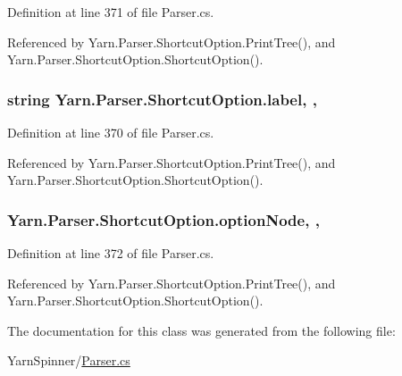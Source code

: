Definition at line 371 of file Parser.\-cs.



Referenced by Yarn.\-Parser.\-Shortcut\-Option.\-Print\-Tree(), and Yarn.\-Parser.\-Shortcut\-Option.\-Shortcut\-Option().

\hypertarget{a00161_ab43ec731479a56891389f6ece87f5f62}{
\subsubsection[{label}]{\setlength{\rightskip}{0pt plus 5cm}string Yarn.\-Parser.\-Shortcut\-Option.\-label\hspace{0.3cm}{\ttfamily [get]}, {\ttfamily [set]}, {\ttfamily [package]}}}\label{a00161_ab43ec731479a56891389f6ece87f5f62}


Definition at line 370 of file Parser.\-cs.



Referenced by Yarn.\-Parser.\-Shortcut\-Option.\-Print\-Tree(), and Yarn.\-Parser.\-Shortcut\-Option.\-Shortcut\-Option().

\hypertarget{a00161_a33d667370031f58b054b79a39891c3f3}{
\subsubsection[{option\-Node}]{ Yarn.\-Parser.\-Shortcut\-Option.\-option\-Node\hspace{0.3cm}{\ttfamily [get]}, {\ttfamily [set]}, {\ttfamily [package]}}}\label{a00161_a33d667370031f58b054b79a39891c3f3}


Definition at line 372 of file Parser.\-cs.



Referenced by Yarn.\-Parser.\-Shortcut\-Option.\-Print\-Tree(), and Yarn.\-Parser.\-Shortcut\-Option.\-Shortcut\-Option().



The documentation for this class was generated from the following file\-:\begin{DoxyCompactItemize}
\item 
Yarn\-Spinner/\hyperlink{a00316}{Parser.\-cs}\end{DoxyCompactItemize}
